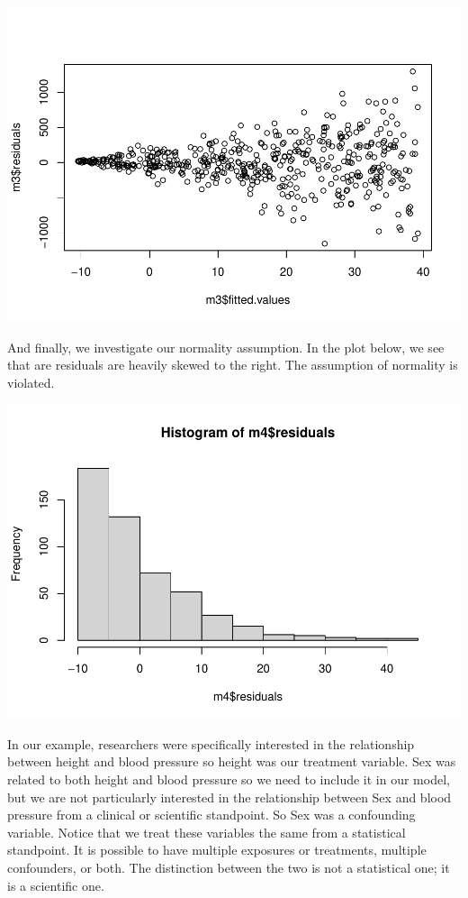 \documentclass[
]{book}
\begin{document}
\includegraphics{MA206supplement_files/figure-latex/unnamed-chunk-14-1.pdf}

And finally, we investigate our normality assumption. In the plot below, we see that are residuals are heavily skewed to the right. The assumption of normality is violated.

\includegraphics{MA206supplement_files/figure-latex/unnamed-chunk-15-1.pdf}

In our example, researchers were specifically interested in the relationship between height and blood pressure so height was our treatment variable. Sex was related to both height and blood pressure so we need to include it in our model, but we are not particularly interested in the relationship between Sex and blood pressure from a clinical or scientific standpoint. So Sex was a confounding variable. Notice that we treat these variables the same from a statistical standpoint. It is possible to have multiple exposures or treatments, multiple confounders, or both. The distinction between the two is not a statistical one; it is a scientific one.\\
\end{document}
